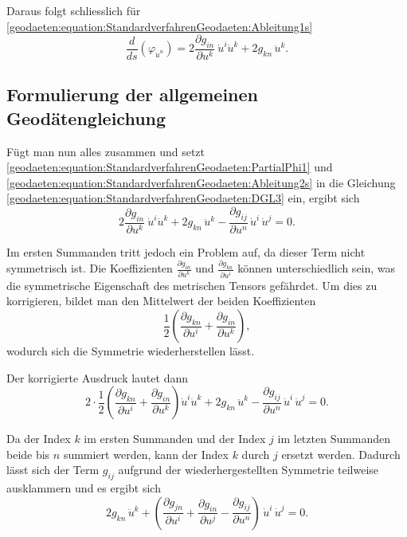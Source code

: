 Daraus folgt schliesslich für \eqref{geodaeten:equation:StandardverfahrenGeodaeten:Ableitung1s}
\begin{equation}
	\frac{d}{ds} \left( \varphi_{\dot{u}^n} \right) = 2 \frac{\partial g_{in}}{\partial u^k} \ \dot{u}^i \dot{u}^k + 2 g_{kn} \, \ddot{u}^k.
	\label{geodaeten:equation:StandardverfahrenGeodaeten:Ableitung2s}
\end{equation}

\subsection{Formulierung der allgemeinen Geodätengleichung}
Fügt man nun alles zusammen und setzt \eqref{geodaeten:equation:StandardverfahrenGeodaeten:PartialPhi1} und \eqref{geodaeten:equation:StandardverfahrenGeodaeten:Ableitung2s} in die Gleichung \eqref{geodaeten:equation:StandardverfahrenGeodaeten:DGL3} ein, ergibt sich
\begin{equation}
	2 \frac{\partial g_{in}}{\partial u^k} \ \dot{u}^i \dot{u}^k + 2 g_{kn} \, \ddot{u}^k - \frac{\partial g_{ij}}{\partial u^n} \, \dot{u}^i \, \dot{u}^j = 0.
\end{equation}

Im ersten Summanden tritt jedoch ein Problem auf, da dieser Term nicht symmetrisch ist. 
Die Koeffizienten $\frac{\partial g_{in}}{\partial u^k}$ und $\frac{\partial g_{kn}}{\partial u^i}$ können unterschiedlich sein, was die symmetrische Eigenschaft des metrischen Tensors gefährdet. 
Um dies zu korrigieren, bildet man den Mittelwert der beiden Koeffizienten
\begin{equation}
	\frac{1}{2} \left( \frac{\partial g_{kn}}{\partial u^i} + \frac{\partial g_{in}}{\partial u^k} \right),
\end{equation}
wodurch sich die Symmetrie wiederherstellen lässt.

Der korrigierte Ausdruck lautet dann
\begin{equation}
	2 \cdot \frac{1}{2} \left( \frac{\partial g_{kn}}{\partial u^i} + \frac{\partial g_{in}}{\partial u^k} \right) \dot{u}^i \dot{u}^k + 2 g_{kn} \, \ddot{u}^k - \frac{\partial g_{ij}}{\partial u^n} \, \dot{u}^i \, \dot{u}^j = 0.
\end{equation}

Da der Index $k$ im ersten Summanden und der Index $j$ im letzten Summanden beide bis $n$ summiert werden, kann der Index $k$ durch $j$ ersetzt werden. 
Dadurch lässt sich der Term $g_{ij}$ aufgrund der wiederhergestellten Symmetrie teilweise ausklammern und es ergibt sich
\begin{equation}
	2 g_{kn} \, \ddot{u}^k + \left( \frac{\partial g_{jn}}{\partial u^i} + \frac{\partial g_{in}}{\partial u^j} - \frac{\partial g_{ij}}{\partial u^n} \right) \, \dot{u}^i \, \dot{u}^j = 0.
\end{equation}


